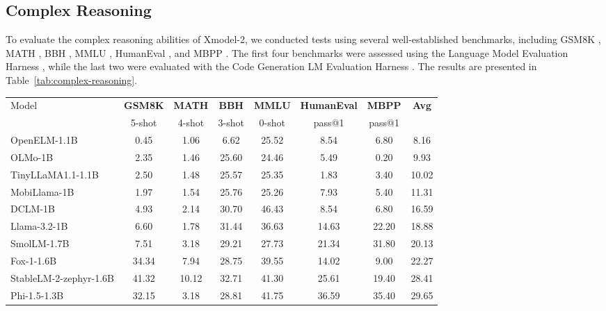 \documentclass{article}
\newcommand{\llm}{Xmodel-2\xspace}
\begin{document}
\subsection{Complex Reasoning}
To evaluate the complex reasoning abilities of \llm, we conducted tests using several well-established benchmarks, including GSM8K \citep{cobbe2021gsm8k}, MATH \citep{hendrycks2021math}, BBH \citep{Suzgun2022ChallengingBT}, MMLU \citep{hendryckstest2021}, HumanEval \citep{chen2021humaneval}, and MBPP \citep{austin2021mbpp}. The first four benchmarks were assessed using the Language Model Evaluation Harness \citep{eval-harness}, while the last two were evaluated with the Code Generation LM Evaluation Harness \citep{bigcode-evaluation-harness}. The results are presented in Table~\ref{tab:complex-reasoning}.

\begin{table}[ht]
  \centering
  \setlength{\tabcolsep}{3pt}
  \begin{tabular}{lccccccc}
    \toprule
    Model & \textbf{GSM8K} & \textbf{MATH} & \textbf{BBH} & \textbf{MMLU} & 
\textbf{HumanEval} & \textbf{MBPP} & \textbf{Avg} \\
    & 5-shot& 4-shot& 3-shot& 0-shot& pass@1& pass@1 \\
    \midrule
    \rowcolor{darkgreen!20}
    OpenELM-1.1B\xspace&0.45&1.06&6.62&25.52&8.54&6.80&8.16 \\ 
    \rowcolor{darkgreen!20}
    OLMo-1B\xspace   &2.35&1.46&25.60&24.46&5.49&0.20&9.93 \\
    \rowcolor{darkgreen!20}
    TinyLLaMA1.1-1.1B\xspace   &2.50&1.48&25.57&25.35&1.83&3.40&10.02 \\
    \rowcolor{darkgreen!20}
    MobiLlama-1B\xspace   &1.97&1.54&25.76&25.26&7.93&5.40&11.31 \\
    \rowcolor{darkgreen!20}
    DCLM-1B\xspace&4.93&2.14&30.70&46.43&8.54&6.80&16.59\\ 
    \rowcolor{darkgreen!20}
    Llama-3.2-1B\xspace  &6.60&1.78&31.44&36.63&14.63&22.20&18.88\\
    \rowcolor{darkgreen!20}
    SmolLM-1.7B\xspace  &7.51&3.18&29.21&27.73&21.34&31.80&20.13\\
    \rowcolor{darkgreen!20}
    Fox-1-1.6B\xspace  &34.34&7.94&28.75&39.55&14.02&9.00&22.27\\ 
    \rowcolor{darkgreen!20}
    StableLM-2-zephyr-1.6B\xspace  &41.32&10.12&32.71&41.30&25.61&19.40&28.41\\
    \rowcolor{darkgreen!20}
    Phi-1.5-1.3B\xspace  &32.15&3.18&28.81&41.75&36.59&35.40&29.65\\

\end{tabular}
\end{table}
\end{document}
